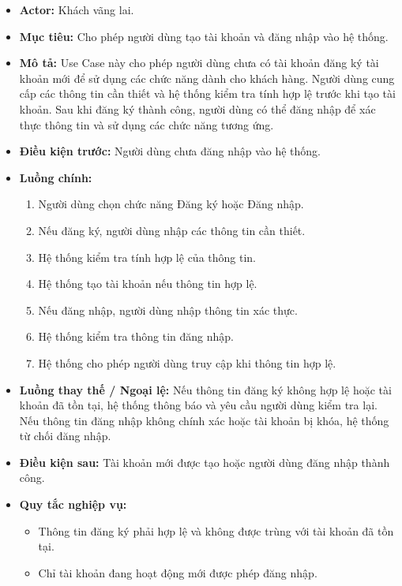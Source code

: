 \documentclass[12pt,a4paper]{article}
\begin{document}
\begin{itemize}

    \item \textbf{Actor:} Khách vãng lai.

    \item \textbf{Mục tiêu:} Cho phép người dùng tạo tài khoản và đăng nhập vào hệ thống.

    \item \textbf{Mô tả:} Use Case này cho phép người dùng chưa có tài khoản đăng ký tài khoản mới để sử dụng các chức năng dành cho khách hàng. Người dùng cung cấp các thông tin cần thiết và hệ thống kiểm tra tính hợp lệ trước khi tạo tài khoản. Sau khi đăng ký thành công, người dùng có thể đăng nhập để xác thực thông tin và sử dụng các chức năng tương ứng.

    \item \textbf{Điều kiện trước:} Người dùng chưa đăng nhập vào hệ thống.

    \item \textbf{Luồng chính:}
    \begin{enumerate}
        \item Người dùng chọn chức năng Đăng ký hoặc Đăng nhập.
        \item Nếu đăng ký, người dùng nhập các thông tin cần thiết.
        \item Hệ thống kiểm tra tính hợp lệ của thông tin.
        \item Hệ thống tạo tài khoản nếu thông tin hợp lệ.
        \item Nếu đăng nhập, người dùng nhập thông tin xác thực.
        \item Hệ thống kiểm tra thông tin đăng nhập.
        \item Hệ thống cho phép người dùng truy cập khi thông tin hợp lệ.
    \end{enumerate}

    \item \textbf{Luồng thay thế / Ngoại lệ:} Nếu thông tin đăng ký không hợp lệ hoặc tài khoản đã tồn tại, hệ thống thông báo và yêu cầu người dùng kiểm tra lại. Nếu thông tin đăng nhập không chính xác hoặc tài khoản bị khóa, hệ thống từ chối đăng nhập.

    \item \textbf{Điều kiện sau:} Tài khoản mới được tạo hoặc người dùng đăng nhập thành công.

    \item \textbf{Quy tắc nghiệp vụ:}
    \begin{itemize}
        \item Thông tin đăng ký phải hợp lệ và không được trùng với tài khoản đã tồn tại.
        \item Chỉ tài khoản đang hoạt động mới được phép đăng nhập.
    \end{itemize}

\end{itemize}
\end{document}
